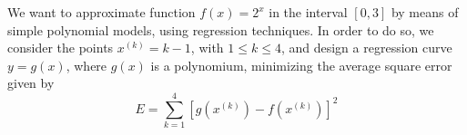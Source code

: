 \question We want to approximate function $f(x)=2^x$ in the interval $[0,3]$ by means of simple polynomial models, using regression techniques.  In order to do so, we consider the points $x^{(k)}=k-1$, with $1\le k \le 4$, and design a regression curve $y=g(x)$, where $g(x)$ is a polynomium, minimizing the average square error given by
$$
E = \sum_{k=1}^4 \left[g\left(x^{(k)}\right)-f\left(x^{(k)}\right)\right]^2
$$

\begin{solution}
\end{solution}

\fi